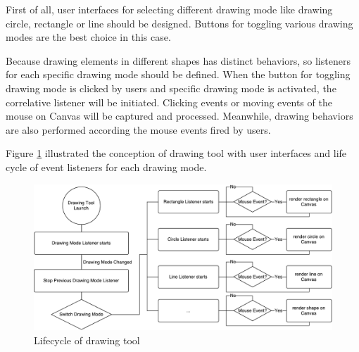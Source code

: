 First of all, user interfaces for selecting different drawing mode like drawing circle, rectangle or line should be designed. Buttons for toggling various drawing modes are the best choice in this case.

Because drawing elements in different shapes has distinct behaviors, so listeners for each specific drawing mode should be defined. When the button for toggling drawing mode is clicked by users and specific drawing mode is activated, the correlative listener will be initiated. Clicking events or moving events of the mouse on Canvas will be captured and processed. Meanwhile, drawing behaviors are also performed according the mouse events fired by users.

Figure \ref{fig:drawing-tool-concept} illustrated the conception of drawing tool with user interfaces and life cycle of event listeners for each drawing mode.

\begin{figure}[!htbp]
  \centering
    \includegraphics[width=1\textwidth]{Figures/concept-drawing-tool.pdf}
  \caption{Lifecycle of drawing tool}
  \label{fig:drawing-tool-concept}
\end{figure}

